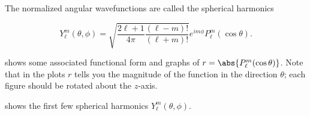 \documentclass[a4paper,12pt]{report}
\begin{document}
The normalized angular wavefunctions are called the spherical harmonics

\begin{equation}
  Y_{\ell }^{m}(\theta ,\phi ) = \sqrt{\frac{2\ell +1}{4\pi } \frac{(\ell -m)!}{(\ell +m)!} } e^{i m \phi }P_{\ell }^{m}(\cos \theta ).      
\end{equation}

 shows some associated functional form and graphs of \(r = \abs{P_{\ell }^{m}  (\cos \theta )}\). Note that in the plots \(r\) tells you the magnitude of the function in the direction \(\theta \); each figure should be rotated about the \(z\)-axis.  

 shows the first few spherical harmonics \(Y_{\ell }^{m}(\theta ,\phi )  \). 


\end{document}

